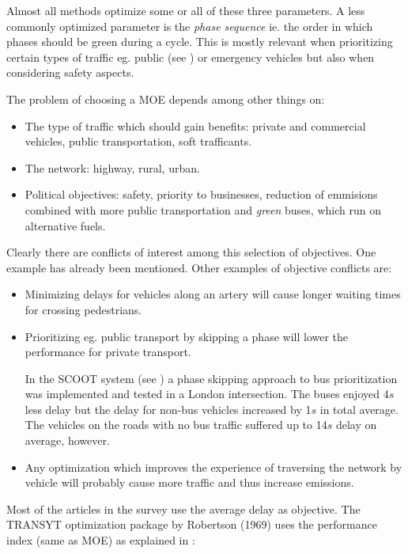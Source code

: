 Almost all methods optimize some or all of these three parameters. A
less commonly optimized parameter is the \textit{phase sequence}
ie. the order in which phases should be green during a cycle. This is
mostly relevant when prioritizing certain types of traffic eg. public
(see \cite{scoot2004}) or emergency vehicles but also when considering
safety aspects.

The problem of choosing a MOE depends among other things on:

\begin{itemize}
\item The type of traffic which should gain benefits: private and commercial vehicles, public transportation, soft trafficants.
\item The network: highway, rural, urban.
\item Political objectives: safety, priority to businesses, reduction of emmisions combined with more public transportation and \textit{green} buses, which run on alternative fuels.
\end{itemize}

Clearly there are conflicts of interest among this selection of
objectives. One example has already been mentioned. Other examples of
objective conflicts are:

\begin{itemize}
\item Minimizing delays for vehicles along an artery will cause longer waiting times for crossing pedestrians.
\item Prioritizing eg. public transport by skipping a phase will lower the performance for private transport. 

In the SCOOT system (see \cite{scoot2004}) a phase skipping approach
to bus prioritization was implemented and tested in a London
intersection. The buses enjoyed 4$s$ less delay but the delay for
non-bus vehicles increased by 1$s$ in total average. The vehicles on
the roads with no bus traffic suffered up to 14$s$ delay on average,
however.

\item Any optimization which improves the experience of traversing the network by vehicle will probably cause more traffic and thus increase emissions.

\end{itemize}

Most of the articles in the survey use the average delay as
objective. The TRANSYT optimization package by Robertson (1969) uses
the performance index (same as MOE) as explained in \cite{26}:

